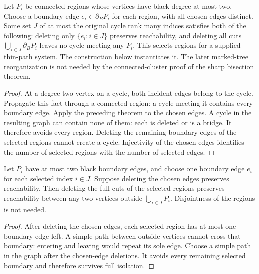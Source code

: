 \begin{theorem}
  \label{thm:lowerbounds-algebraic-cycle-region-selection}
  \leanok
  Let $P_i$ be connected regions whose vertices have black degree at most
  two. Choose a boundary edge $e_i\in\partial_B P_i$ for each region,
  with all chosen edges distinct. Some set $J$ of at most the original
  cycle rank many indices satisfies both of the following: deleting only
  $\{e_i:i\in J\}$ preserves reachability, and deleting all cuts
  $\bigcup_{i\in J}\partial_B P_i$ leaves no cycle meeting any $P_i$.
  This selects regions for a supplied thin-path system. The construction
  below instantiates it. The later marked-tree reorganization is not needed
  by the connected-cluster proof of the sharp bisection theorem.
\end{theorem}
\begin{proof}
  \leanok
  At a degree-two vertex on a cycle, both incident edges belong to the
  cycle. Propagate this fact through a connected region: a cycle meeting
  it contains every boundary edge. Apply the preceding theorem to the
  chosen edges. A cycle in the resulting graph can contain none of them:
  each is deleted or is a bridge. It therefore avoids every region.
  Deleting the remaining boundary edges of the selected regions cannot
  create a cycle. Injectivity of the chosen edges identifies the number
  of selected regions with the number of selected edges.
\end{proof}

\begin{theorem}
  \label{thm:lowerbounds-algebraic-isolation-core-connectivity}
  \leanok
  Let $P_i$ have at most two black boundary edges, and choose one boundary
  edge $e_i$ for each selected index $i\in J$. Suppose deleting the chosen
  edges preserves reachability. Then deleting the full cuts of the selected
  regions preserves reachability between any two vertices outside
  $\bigcup_{i\in J}P_i$. Disjointness of the regions is not needed.
\end{theorem}
\begin{proof}
  \leanok
  After deleting the chosen edges, each selected region has at most one
  boundary edge left. A simple path between outside vertices cannot cross
  that boundary: entering and leaving would repeat its sole edge. Choose
  a simple path in the graph after the chosen-edge deletions. It avoids
  every remaining selected boundary and therefore survives full isolation.
\end{proof}

